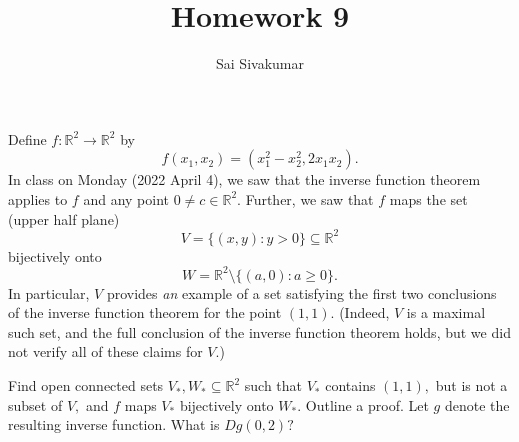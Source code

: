 \documentclass[12pt]{amsart}
\title{Homework 9}
\author{Sai Sivakumar}
\newcommand{\RR}{\mathbb{R}}
\begin{document}
\maketitle

Define $f:\RR^2\to \RR^2$ by 
\[
 f(x_1,x_2) = (x_1^2-x_2^2, 2x_1x_2).
\]
 In class on Monday (2022 April 4), we saw that the 
inverse function theorem applies to $f$ and any point
 $0\ne c \in \RR^2.$  Further, we saw that $f$ maps
the set (upper half plane)
\[
 V= \{(x,y):y>0\} \subseteq \RR^2
\]
 bijectively onto
\[
 W=\RR^2 \setminus \{(a,0): a\ge 0\}.
\]
 In particular, $V$ provides {\it an} example of a set
 satisfying the first two  conclusions of the inverse function theorem
 for the point $(1,1).$ (Indeed, $V$ is a maximal such set, and 
 the full conclusion of the inverse function theorem holds, but we did 
 not verify all of these claims for $V$.)
 
 Find  open connected sets $V_*, W_* \subseteq \RR^2$ such that $V_*$ contains $(1,1),$
 but is not a subset of $V,$ and $f$ maps $V_*$ bijectively
 onto $W_*.$ Outline a proof. Let $g$ denote the
 resulting inverse function. What is $Dg(0,2)?$

\bigskip
\end{document}
